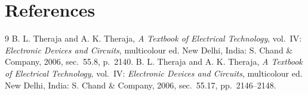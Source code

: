 \documentclass[12pt,a4paper]{article}
\begin{document}
	\section{References}
	\renewcommand{\refname}{} %
	\begin{thebibliography}{9}
		 B. L. Theraja and A. K. Theraja,
		\textit{A Textbook of Electrical Technology}, vol.~IV:
		\textit{Electronic Devices and Circuits}, multicolour ed. New Delhi,
		India: S. Chand \& Company, 2006, sec.~55.8, p.~2140.
		 B. L. Theraja and A. K. Theraja,
		\textit{A Textbook of Electrical Technology}, vol.~IV:
		\textit{Electronic Devices and Circuits}, multicolour ed. New Delhi,
		India: S. Chand \& Company, 2006, sec.~55.17, pp.~2146--2148.
	\end{thebibliography}
	
\end{document}
